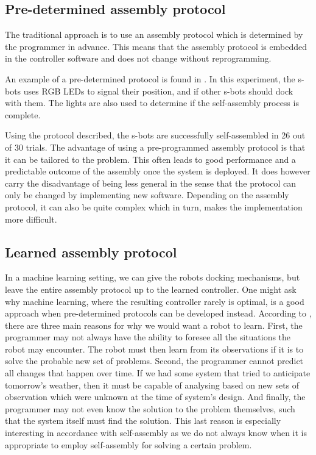 \subsection{Pre-determined assembly protocol}
The traditional approach is to use an assembly protocol which is determined by the programmer in advance.
This means that the assembly protocol is embedded in the controller software and does not change without reprogramming. 

An example of a pre-determined protocol is found in \cite{gross_object_2006}.
In this experiment, the s-bots uses RGB LEDs to signal their position, and if other s-bots should dock with them.
The lights are also used to determine if the self-assembly process is complete. 

Using the protocol described, the s-bots are successfully self-assembled in 26 out of 30 trials. The advantage of using a pre-programmed assembly protocol is that it can be tailored to the problem. This often leads to good performance and a predictable outcome of the assembly once the system is deployed. It does however carry the disadvantage of being less general in the sense that the protocol can only be changed by implementing new software. Depending on the assembly protocol, it can also be quite complex which in turn, makes the implementation more difficult.

\subsection{Learned assembly protocol}
In a machine learning setting, we can give the robots docking mechanisms, but leave the entire assembly protocol up to the learned controller.
One might ask why machine learning, where the resulting controller rarely is optimal, is a good approach when pre-determined protocols can be developed instead.
According to \cite{russell_artificial_1995}, there are three main reasons for why we would want a robot to learn.
First, the programmer may not always have the ability to foresee all the situations the robot may encounter.
The robot must then learn from its observations if it is to solve the probable new set of problems.
Second, the programmer cannot predict all changes that happen over time. 
If we had some system that tried to anticipate tomorrow's weather, then it must be capable of analysing based on new sets of observation which were unknown at the time of system's design.
And finally, the programmer may not even know the solution to the problem themselves, such that the system itself must find the solution.
This last reason is especially interesting in accordance with self-assembly as we do not always know when it is appropriate to employ self-assembly for solving a certain problem.

